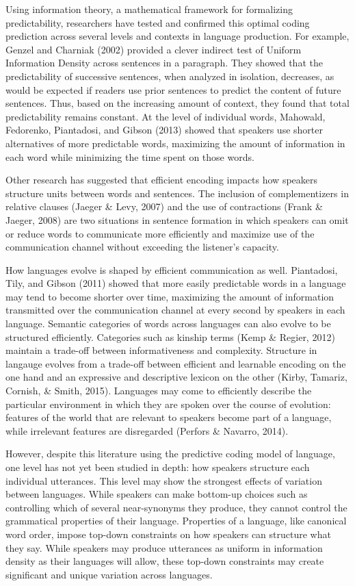 \documentclass[man,floatsintext]{apa6}
\begin{document}
Using information theory, a mathematical framework for formalizing predictability, researchers have tested and confirmed this optimal coding prediction across several levels and contexts in language production. For example, Genzel and Charniak (2002) provided a clever indirect test of Uniform Information Density across sentences in a paragraph. They showed that the predictability of successive sentences, when analyzed in isolation, decreases, as would be expected if readers use prior sentences to predict the content of future sentences. Thus, based on the increasing amount of context, they found that total predictability remains constant. At the level of individual words, Mahowald, Fedorenko, Piantadosi, and Gibson (2013) showed that speakers use shorter alternatives of more predictable words, maximizing the amount of information in each word while minimizing the time spent on those words.

Other research has suggested that efficient encoding impacts how speakers structure units between words and sentences. The inclusion of complementizers in relative clauses (Jaeger \& Levy, 2007) and the use of contractions (Frank \& Jaeger, 2008) are two situations in sentence formation in which speakers can omit or reduce words to communicate more efficiently and maximize use of the communication channel without exceeding the listener's capacity.

How languages evolve is shaped by efficient communication as well. Piantadosi, Tily, and Gibson (2011) showed that more easily predictable words in a language may tend to become shorter over time, maximizing the amount of information transmitted over the communication channel at every second by speakers in each language. Semantic categories of words across languages can also evolve to be structured efficiently. Categories such as kinship terms (Kemp \& Regier, 2012) maintain a trade-off between informativeness and complexity. Structure in langauge evolves from a trade-off between efficient and learnable encoding on the one hand and an expressive and descriptive lexicon on the other (Kirby, Tamariz, Cornish, \& Smith, 2015). Languages may come to efficiently describe the particular environment in which they are spoken over the course of evolution: features of the world that are relevant to speakers become part of a language, while irrelevant features are disregarded (Perfors \& Navarro, 2014).

However, despite this literature using the predictive coding model of language, one level has not yet been studied in depth: how speakers structure each individual utterances. This level may show the strongest effects of variation between languages. While speakers can make bottom-up choices such as controlling which of several near-synonyms they produce, they cannot control the grammatical properties of their language. Properties of a language, like canonical word order, impose top-down constraints on how speakers can structure what they say. While speakers may produce utterances as uniform in information density as their languages will allow, these top-down constraints may create significant and unique variation across languages.
\end{document}
